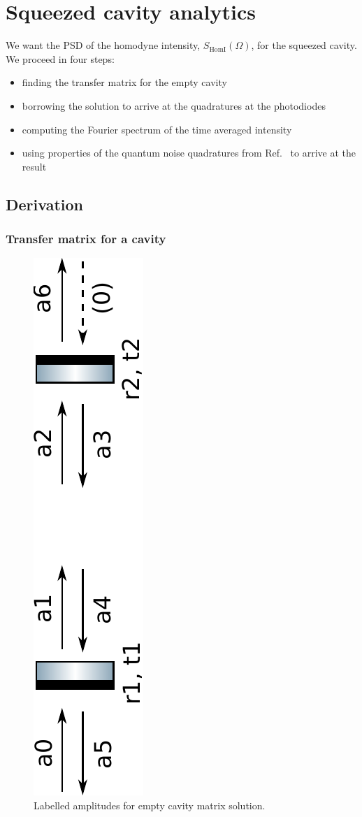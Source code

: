 \documentclass[aps,pra,superscriptaddress,reprint,nofootinbib]{revtex4-1}
\begin{document}
\appendix
\section{Squeezed cavity analytics}
\label{app:squeezed_cavity_analytics}

We want the PSD of the homodyne intensity, $S_{\mathrm{HomI}}(\Omega)$, for the squeezed cavity. We proceed in four steps:
\begin{itemize}
\item finding the transfer matrix for the empty cavity
\item borrowing the solution to arrive at the quadratures at the photodiodes
\item computing the Fourier spectrum of the time averaged intensity
\item using properties of the quantum noise quadratures from Ref.~\cite{Danilishin_2012} to arrive at the result
\end{itemize}

\subsection{Derivation}

\subsubsection{Transfer matrix for a cavity}

\begin{figure}
	\begin{center}
	\includegraphics[height=0.45\textwidth, angle=-90]{figures/empty_cavity_amplitudes.pdf}
	\end{center}
	\caption{Labelled amplitudes for empty cavity matrix solution.}
	\label{fig:empty_cavity_amplitudes}
\end{figure}
\end{document}
